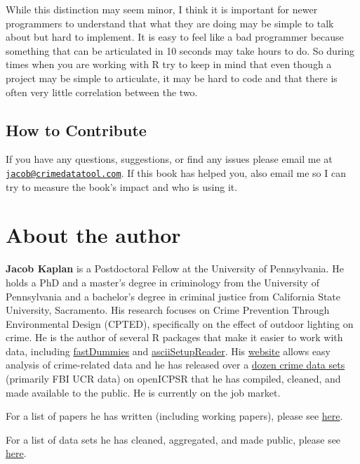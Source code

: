 \documentclass[
  12pt,
]{book}
\begin{document}
While this distinction may seem minor, I think it is important for newer programmers to understand that what they are doing may be simple to talk about but hard to implement. It is easy to feel like a bad programmer because something that can be articulated in 10 seconds may take hours to do. So during times when you are working with R try to keep in mind that even though a project may be simple to articulate, it may be hard to code and that there is often very little correlation between the two.

\hypertarget{how-to-contribute}{%
\section*{How to Contribute}\label{how-to-contribute}}


If you have any questions, suggestions, or find any issues please email me at \href{mailto:jacob@crimedatatool.com}{\nolinkurl{jacob@crimedatatool.com}}. If this book has helped you, also email me so I can try to measure the book's impact and who is using it.

\hypertarget{about-the-author}{%
\chapter*{About the author}\label{about-the-author}}


\textbf{Jacob Kaplan} is a Postdoctoral Fellow at the University of Pennsylvania. He holds a PhD and a master's degree in criminology from the University of Pennsylvania and a bachelor's degree in criminal justice from California State University, Sacramento. His research focuses on Crime Prevention Through Environmental Design (CPTED), specifically on the effect of outdoor lighting on crime. He is the author of several R packages that make it easier to work with data, including \href{https://jacobkap.github.io/fastDummies/}{fastDummies} and \href{https://jacobkap.github.io/asciiSetupReader/}{asciiSetupReader}. His \href{http://jacobdkaplan.com/}{website} allows easy analysis of crime-related data and he has released over a \href{http://jacobdkaplan.com/data.html}{dozen crime data sets} (primarily FBI UCR data) on openICPSR that he has compiled, cleaned, and made available to the public. He is currently on the job market.

For a list of papers he has written (including working papers), please see \href{http://jacobdkaplan.com/research.html}{here}.

For a list of data sets he has cleaned, aggregated, and made public, please see \href{http://jacobdkaplan.com/data.html}{here}.
\end{document}

